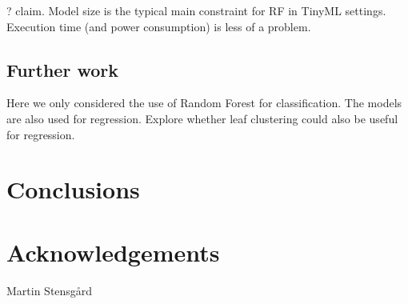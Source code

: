 \documentclass{article}
\begin{document}
? claim. Model size is the typical main constraint for RF in TinyML settings.
Execution time (and power consumption) is less of a problem.

\subsection{Further work}

Here we only considered the use of Random Forest for classification.
The models are also used for regression.
Explore whether leaf clustering could also be useful for regression.


\section{Conclusions}


\section*{Acknowledgements}
\noindent

Martin Stensgård

\newpage

 
\end{document}
